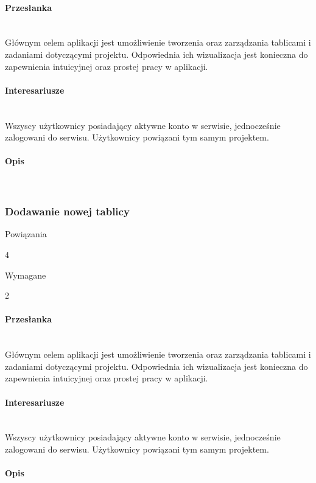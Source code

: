\documentclass[eng,printmode]{mgr}
\begin{document}
\paragraph{Przesłanka}\ \\
Głównym celem aplikacji jest umożliwienie tworzenia oraz zarządzania tablicami i zadaniami dotyczącymi projektu. Odpowiednia ich wizualizacja jest konieczna do zapewnienia intuicyjnej oraz prostej pracy w aplikacji.

\paragraph{Interesariusze}\ \\
Wszyscy użytkownicy posiadający aktywne konto w serwisie, jednocześnie zalogowani do serwisu. Użytkownicy powiązani tym samym projektem.

\paragraph{Opis}\ \\
\newpage

\subsubsection{Dodawanie nowej tablicy}
\begin{labeling}{Powiązania}
\item [ID:] 4
\item [Typ:] Wymagane
\item [Powiązania] 2
\end{labeling}

\paragraph{Przesłanka}\ \\
Głównym celem aplikacji jest umożliwienie tworzenia oraz zarządzania tablicami i zadaniami dotyczącymi projektu. Odpowiednia ich wizualizacja jest konieczna do zapewnienia intuicyjnej oraz prostej pracy w aplikacji.

\paragraph{Interesariusze}\ \\
Wszyscy użytkownicy posiadający aktywne konto w serwisie, jednocześnie zalogowani do serwisu. Użytkownicy powiązani tym samym projektem.

\paragraph{Opis}\ \\
\newpage
\end{document}
